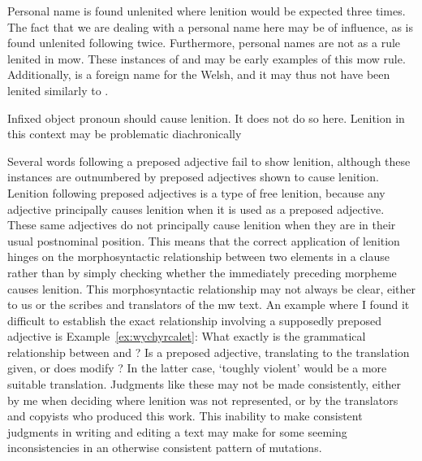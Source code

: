 Personal name  is found unlenited where lenition would be expected three times.
The fact that we are dealing with a personal name here may be of influence, as  is found unlenited following  twice.
Furthermore, personal names are not as a rule lenited in \gls{mow}.
These instances of  and  may be early examples of this \gls{mow} rule.
Additionally,  is a foreign name for the Welsh, and it may thus not have been lenited similarly to .

Infixed object pronoun  should cause lenition. It does not do so here.
Lenition in this context may be problematic diachronically 

Several words following a preposed adjective fail to show lenition, although these instances are outnumbered by preposed adjectives shown to cause lenition.
Lenition following preposed adjectives is a type of free lenition, because any adjective principally causes lenition when it is used as a preposed adjective.
These same adjectives do not principally cause lenition when they are in their usual postnominal position.
This means that the correct application of lenition hinges on the morphosyntactic relationship between two elements in a clause rather than by simply checking whether the immediately preceding morpheme causes lenition.
This morphosyntactic relationship may not always be clear, either to us or the scribes and translators of the \gls{mw} text.
An example where I found it difficult to establish the exact relationship involving a supposedly preposed adjective is Example~\ref{ex:wychyrcalet}:
What exactly is the grammatical relationship between  and ?
Is  a preposed adjective, translating to the translation given, or does  modify ?
In the latter case, `toughly violent' would be a more suitable translation. 
Judgments like these may not be made consistently, either by me when deciding where lenition was not represented, or by the translators and copyists who produced this work.
This inability to make consistent judgments in writing and editing a text may make for some seeming inconsistencies in an otherwise consistent pattern of mutations.

